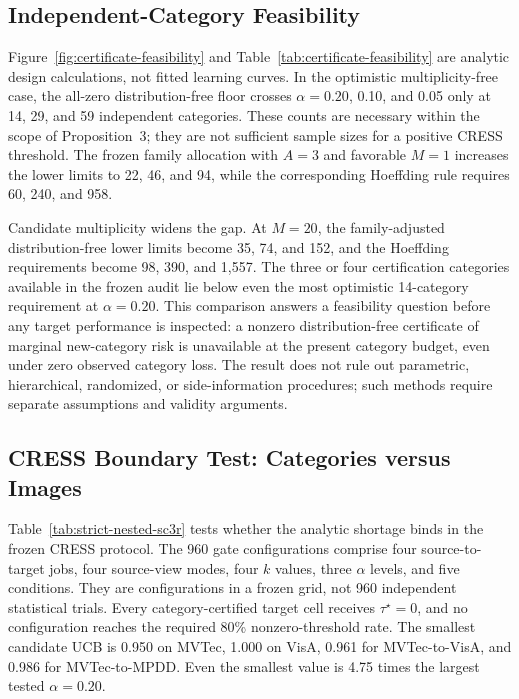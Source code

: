 \subsection{Independent-Category Feasibility}\label{sec:category-feasibility-results}
Figure~\ref{fig:certificate-feasibility} and Table~\ref{tab:certificate-feasibility} are analytic design calculations, not fitted learning curves. In the optimistic multiplicity-free case, the all-zero distribution-free floor crosses $\alpha=0.20$, 0.10, and 0.05 only at 14, 29, and 59 independent categories. These counts are necessary within the scope of Proposition~3; they are not sufficient sample sizes for a positive CRESS threshold. The frozen family allocation with $A=3$ and favorable $M=1$ increases the lower limits to 22, 46, and 94, while the corresponding Hoeffding rule requires 60, 240, and 958.

Candidate multiplicity widens the gap. At $M=20$, the family-adjusted distribution-free lower limits become 35, 74, and 152, and the Hoeffding requirements become 98, 390, and 1,557. The three or four certification categories available in the frozen audit lie below even the most optimistic 14-category requirement at $\alpha=0.20$. This comparison answers a feasibility question before any target performance is inspected: a nonzero distribution-free certificate of marginal new-category risk is unavailable at the present category budget, even under zero observed category loss. The result does not rule out parametric, hierarchical, randomized, or side-information procedures; such methods require separate assumptions and validity arguments.

\subsection{CRESS Boundary Test: Categories versus Images}\label{sec:cress-strict-results}



Table~\ref{tab:strict-nested-sc3r} tests whether the analytic shortage binds in the frozen CRESS protocol. The 960 gate configurations comprise four source-to-target jobs, four source-view modes, four $k$ values, three $\alpha$ levels, and five conditions. They are configurations in a frozen grid, not 960 independent statistical trials. Every category-certified target cell receives $\tau^\star=0$, and no configuration reaches the required 80\% nonzero-threshold rate. The smallest candidate UCB is 0.950 on MVTec, 1.000 on VisA, 0.961 for MVTec-to-VisA, and 0.986 for MVTec-to-MPDD. Even the smallest value is 4.75 times the largest tested $\alpha=0.20$.

